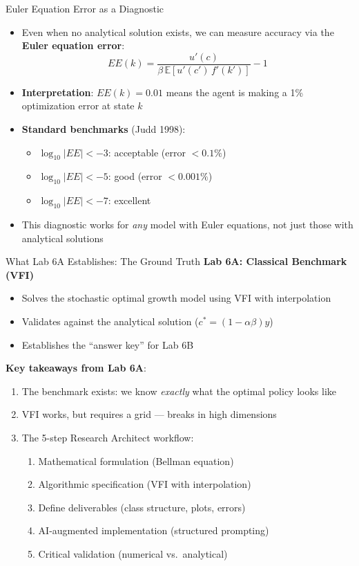 \documentclass[10pt,english,aspectratio=169]{beamer}
\begin{document}
\begin{frame}{Euler Equation Error as a Diagnostic}
\begin{itemize}
  \item Even when no analytical solution exists, we can measure accuracy via the \textbf{Euler equation error}:
    \[
      EE(k) = \frac{u'(c)}{\beta\, \mathbb{E}[u'(c')\, f'(k')]} - 1
    \]
  \medskip
  \item \textbf{Interpretation}: $EE(k) = 0.01$ means the agent is making a 1\% optimization error at state $k$
  \medskip
  \item \textbf{Standard benchmarks} (Judd 1998):
    \begin{itemize}
      \item $\log_{10}|EE| < -3$: acceptable (error $< 0.1\%$)
      \item $\log_{10}|EE| < -5$: good (error $< 0.001\%$)
      \item $\log_{10}|EE| < -7$: excellent
    \end{itemize}
  \medskip
  \item This diagnostic works for \emph{any} model with Euler equations, not just those with analytical solutions
\end{itemize}
\end{frame}

\begin{frame}{What Lab 6A Establishes: The Ground Truth}
\textbf{Lab 6A: Classical Benchmark (VFI)}
\begin{itemize}
  \item Solves the stochastic optimal growth model using VFI with interpolation
  \item Validates against the analytical solution ($c^* = (1-\alpha\beta)y$)
  \item Establishes the ``answer key'' for Lab 6B
\end{itemize}

\vspace{0.2cm}
\textbf{Key takeaways from Lab 6A}:
\begin{enumerate}
  \item The benchmark exists: we know \emph{exactly} what the optimal policy looks like
  \item VFI works, but requires a grid --- breaks in high dimensions
  \item The 5-step Research Architect workflow:
    \begin{enumerate}
      \item Mathematical formulation (Bellman equation)
      \item Algorithmic specification (VFI with interpolation)
      \item Define deliverables (class structure, plots, errors)
      \item AI-augmented implementation (structured prompting)
      \item Critical validation (numerical vs.\ analytical)
    \end{enumerate}
\end{enumerate}
\end{frame}
\end{document}
